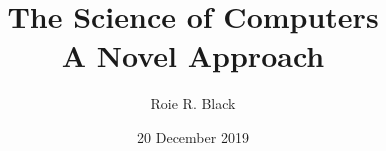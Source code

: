 \documentclass[12pt,twoside,titlepage]{book}
\title{
	{The Science of Computers}\\
	{\large A Novel Approach}
}
\author{Roie R. Black}
\date{20 December 2019}
\begin{document}
  \graphicspath{{./assets/images/}}
  \frontmatter
    \maketitle
    \tableofcontents
    \listoffigures
    
  \mainmatter
    
    
  \backmatter
    \appendix
      
    
\end{document}
